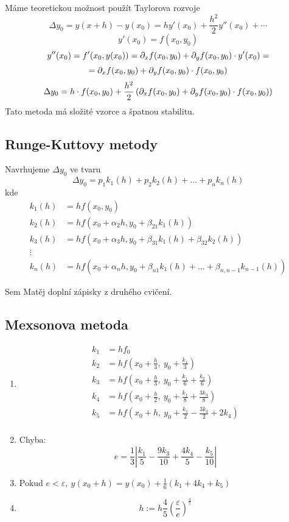 	Máme teoretickou možnost použít Taylorova rozvoje
	$$ \Delta y_0 = y(x+h) - y(x_0) = hy'(x_0) + \frac{h^2}{2}y''(x_0) + \dotsb$$
	$$ y'(x_0) = f(x_0,y_0)$$
	$$ y''(x_0) = f'(x_0,y(x_0)) = \partial_x f(x_0,y_0) + \partial_y f(x_0,y_0)\cdot y'(x_0)=$$
	$$ = \partial_x f(x_0,y_0) + \partial_y f(x_0,y_0)\cdot f(x_0,y_0)$$
	$$ \Delta y_0 = h \cdot f(x_0,y_0) + \frac{h^2}{2}\left( \partial_x f(x_0,y_0) + \partial_y f(x_0,y_0)
	\cdot f(x_0,y_0) \right)$$
	Tato metoda má složité vzorce a špatnou stabilitu.
	
	\subsection{Runge-Kuttovy metody}
	
	Navrhujeme $\Delta y_0$ ve tvaru
	$$\Delta y_0 = p_1 k_1 (h) + p_2 k_2 (h) + \dots + p_n k_n (h)$$
	kde
	\vspace{-1ex}
	\begin{align*}
		k_1 (h) &= h f(x_0,y_0) \\
		k_2 (h) &= h f(x_0 + \alpha_2 h,y_0 + \beta_{21} k_1 (h)) \\
		k_3 (h) &= h f(x_0 + \alpha_3 h,y_0 + \beta_{31} k_1 (h) + \beta_{32} k_2 (h)) \\
		\vdots \\
		k_n (h) &= h f(x_0 + \alpha_n h,y_0 + \beta_{n1} k_1 (h) + \dots + \beta_{n,n-1}
		k_{n-1} (h))
	\end{align*}
	
	Sem Matěj doplní zápisky z druhého cvičení.
	
	\subsection{Mexsonova metoda}
	
	\begin{enumerate}
		\item \begin{align*}
			k_1 &= hf_0 \\
			k_2 &= hf\left(x_0 + \frac{h}{3},\ y_0 + \frac{k_1}{3} \right) \\
			k_3 &= hf\left(x_0 + \frac{h}{3},\ y_0 + \frac{k_1}{6} + \frac{k_2}{6} \right) \\
			k_4 &= hf\left(x_0 + \frac{h}{2},\ y_0 + \frac{k_1}{8} + \frac{3k_3}{8} \right) \\
			k_5 &= hf\left(x_0 + h,\ y_0 + \frac{k_1}{2} - \frac{3k_3}{2} + 2k_4 \right) \\
		\end{align*}
		\item Chyba:
			$$ e = \frac{1}{3} \left| \frac{k_1}{5} - \frac{9k_3}{10} + \frac{4k_4}{5} -
			\frac{k_5}{10}\right| $$
		\item Pokud $ e < \varepsilon,\ y(x_0 + h) = y(x_0) + \frac{1}{6}(k_1 + 4k_4 + k_5)$
		\item $$ h := h \frac{4}{5} \left( \frac{\varepsilon}{e}\right)^{\frac{4}{5}} $$
	\end{enumerate}
	
